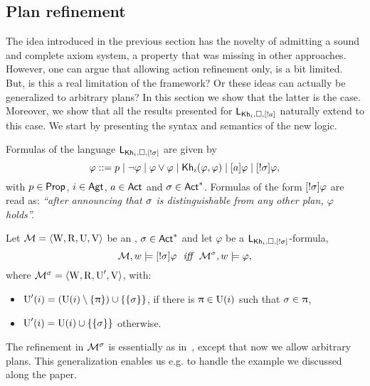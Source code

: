\subsection{Plan refinement}
\label{sec:planref}

The idea introduced in the previous section has the novelty of admitting a sound and complete axiom system, a property that was missing in other approaches. However, one can argue that allowing action refinement only, is a bit limited. But, is this a real limitation of the framework? Or these ideas can actually be generalized to arbitrary plans? In this section we show that the latter is the case. Moreover, we show that all the results presented for $\mathsf{L}_{{\sf Kh}_i,\square,[!a]}$ naturally extend to this case.
We start by presenting the syntax and semantics of the new logic. 

\medskip 

\begin{definition}\label{def:srefsyntax}
Formulas of the language $\mathsf{L}_{{\sf Kh}_i,\square,[!\sigma]}$ are given by
\[
\varphi ::= p \mid \neg\varphi \mid \varphi\vee\varphi \mid {\sf Kh}_i(\varphi,\varphi) \mid [a]\varphi \mid [!\sigma]\varphi,
\]
with $p \in {\rm \sf Prop}$, $i\in{\rm \sf Agt}$, $a \in {\rm \sf Act}$ and $\sigma \in {\rm \sf Act}^*$.  Formulas of the form $[!\sigma]\varphi$ are read as: \emph{``after announcing that $\sigma$ is distinguishable from any other plan, $\varphi$ holds''.} 
\end{definition}

\medskip 

\begin{definition}\label{def:srefsemantics}
Let $\mathcal{M} = \langle \operatorname{W}, \operatorname{R}, \operatorname{U}, \operatorname{V} \rangle$ be an \ults, $\sigma \in {\rm \sf Act}^*$ and let $\varphi$ be a $\mathsf{L}_{{\sf Kh}_i,\square,[!\sigma]}$-formula,
\[
\modults,w \models \srefbox{\plan}\varphi \ \ \iff \ \ \modults^\plan,w \models \varphi,
\]
where $\mathcal{M}^\sigma = \langle \operatorname{W},\operatorname{R},\operatorname{U}',\operatorname{V} \rangle$, with:
\begin{itemize}
\item $\operatorname{U}'(i) = (\operatorname{U}(i) \setminus \{ \uppi \}) \cup \{ \{ \sigma \} \}$, if there is $\uppi \in \operatorname{U}(i)$ such that $\sigma \in \uppi$,
\item $\operatorname{U}'(i) = \operatorname{U}(i) \cup \{ \{ \sigma \} \}$ otherwise.
\end{itemize}
\end{definition}

\medskip 

The refinement in $\mathcal{M}^\sigma$ is essentially as in~, except that now we allow arbitrary plans. This generalization enables us e.g. to handle the example we discussed  along the paper.

